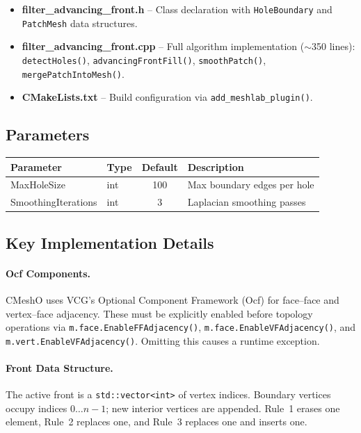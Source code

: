 \documentclass[12pt,a4paper]{article}
\begin{document}
\begin{itemize}[leftmargin=2em]
  \item \textbf{filter\_advancing\_front.h} -- Class declaration with \texttt{HoleBoundary} and \texttt{PatchMesh} data structures.
  \item \textbf{filter\_advancing\_front.cpp} -- Full algorithm implementation ($\sim$350 lines): \texttt{detectHoles()}, \texttt{advancingFrontFill()}, \texttt{smoothPatch()}, \texttt{mergePatchIntoMesh()}.
  \item \textbf{CMakeLists.txt} -- Build configuration via \texttt{add\_meshlab\_plugin()}.
\end{itemize}

\subsection{Parameters}

\begin{table}[h]
\centering
\begin{tabular}{@{}llcl@{}}
\toprule
\textbf{Parameter} & \textbf{Type} & \textbf{Default} & \textbf{Description} \\
\midrule
MaxHoleSize        & int  & 100 & Max boundary edges per hole \\
SmoothingIterations & int & 3   & Laplacian smoothing passes \\
\bottomrule
\end{tabular}
\end{table}

\subsection{Key Implementation Details}

\paragraph{Ocf Components.}
CMeshO uses VCG's Optional Component Framework (Ocf) for face--face and vertex--face adjacency. These must be explicitly enabled before topology operations via \texttt{m.face.EnableFFAdjacency()}, \texttt{m.face.EnableVFAdjacency()}, and \texttt{m.vert.EnableVFAdjacency()}. Omitting this causes a runtime exception.

\paragraph{Front Data Structure.}
The active front is a \texttt{std::vector<int>} of vertex indices. Boundary vertices occupy indices $0 \dots n{-}1$; new interior vertices are appended. Rule~1 erases one element, Rule~2 replaces one, and Rule~3 replaces one and inserts one.
\end{document}
